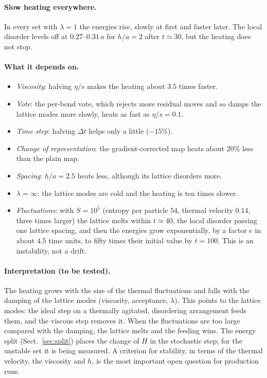 \documentclass[11pt,aps,preprint,nofootinbib,superscriptaddress,tightenlines]{revtex4-2}
\def\Sect#1{Sect.~\ref{#1}}
\let\oldparagraph\paragraph
\renewcommand{\paragraph}{\par\bigskip\oldparagraph}
\begin{document}
\paragraph{Slow heating everywhere.}  In every set with $\lambda=1$ the energies
rise, slowly at first and faster later.  The local disorder levels off at
$0.27$--$0.31\,a$ for $h/a=2$ after $t\simeq30$, but the heating does not stop.

\paragraph{What it depends on.}
\begin{itemize}
\item \emph{Viscosity}: halving $\eta/s$ makes the heating about $3.5$ times faster.
\item \emph{Vote}: the per-bond vote, which rejects more residual moves and
  so damps the lattice modes more slowly, heats as fast as $\eta/s=0.1$.
\item \emph{Time step}: halving $\Delta t$ helps only a little ($-15\%$).
\item \emph{Change of representation}: the gradient-corrected map heats about
  $20\%$ less than the plain map.
\item \emph{Spacing}: $h/a=2.5$ heats less, although its lattice disorders more.
\item \emph{$\lambda=\infty$}: the lattice modes are cold and the heating is ten times
  slower.
\item \emph{Fluctuations}: with $S=10^5$ (entropy per particle $54$, thermal
  velocity $0.14$, three times larger) the lattice melts within $t\simeq40$, the
  local disorder passing one lattice spacing, and then the energies grow
  exponentially, by a factor $e$ in about $4.5$ time units, to fifty times their
  initial value by $t=100$.  This is an instability, not a drift.
\end{itemize}

\paragraph{Interpretation (to be tested).}  The heating grows with the size of
the thermal fluctuations and falls with the damping of the lattice modes
(viscosity, acceptance, $\lambda$).  This points to the lattice modes: the ideal
step on a thermally agitated, disordering arrangement feeds them, and the
viscous step removes it.  When the fluctuations are too large compared with
the damping, the lattice melts and the feeding wins.  The energy split
(\Sect{sec:split}) places the change of $H$ in the stochastic step; for the
unstable set it is being measured.  A criterion for stability, in terms of the
thermal velocity, the viscosity and $h$, is the most important open question
for production runs.
\end{document}
